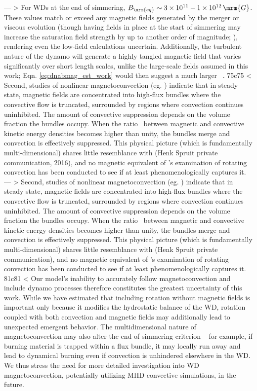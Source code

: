 ---
> \noindent For WDs at the end of simmering, $B_\mrm{eq} \sim 3\times10^{11}-1\times10^{12}\,\mrm{G}$.  These values match or exceed any magnetic fields generated by the merger or viscous evolution (though having fields in place at the start of simmering may increase the saturation field strength by up to another order of magnitude; \citealt{feat+09}), rendering even the low-field calculations uncertain.  Additionally, the turbulent nature of the dynamo will generate a highly tangled magnetic field that varies significantly over short length scales, unlike the large-scale fields assumed in this work; Eqn. \ref{eq:dnabmag_est_work} would then suggest a much larger \dnabmag\ \citep{chabgb07}.
75c75
< Second, studies of nonlinear magnetoconvection (eg. \citealt{procw82}) indicate that in steady state, magnetic fields are concentrated into high-flux bundles where the convective flow is truncated, surrounded by regions where convection continues uninhibited.  The amount of convective suppression depends on the volume fraction the bundles occupy.  When the ratio \EBEconv\ between magnetic and convective kinetic energy densities becomes higher than unity, the bundles merge and convection is effectively suppressed.  This physical picture (which is fundamentally multi-dimensional) shares little resemblance with \citeal{stev79} (Henk Spruit private communication, 2016), and no magnetic equivalent of \cite{barkdl14}'s examination of rotating convection has been conducted to see if \citeal{stev79} at least phenomenologically captures it.
---
> Second, studies of nonlinear magnetoconvection (eg. \citealt{procw82}) indicate that in steady state, magnetic fields are concentrated into high-flux bundles where the convective flow is truncated, surrounded by regions where convection continues uninhibited.  The amount of convective suppression depends on the volume fraction the bundles occupy.  When the ratio \EBEconv\ between magnetic and convective kinetic energy densities becomes higher than unity, the bundles merge and convection is effectively suppressed.  This physical picture (which is fundamentally multi-dimensional) shares little resemblance with \citeal{stev79} (Henk Spruit private communication), and no magnetic equivalent of \cite{barkdl14}'s examination of rotating convection has been conducted to see if \citeal{stev79} at least phenomenologically captures it.
81c81
< Our model's inability to accurately follow magnetoconvection and include dynamo processes therefore constitutes the greatest uncertainty of this work.  While we have estimated that including rotation without magnetic fields is important only because it modifies the hydrostatic balance of the WD, rotation coupled with both convection and magnetic fields may additionally lead to unexpected emergent behavior.  The multidimensional nature of magnetoconvection may also alter the end of simmering criterion -- for example, if burning material is trapped within a flux bundle, it may locally run away and lead to dynamical burning even if convection is unhindered elsewhere in the WD.  We thus stress the need for more detailed investigation into WD magnetoconvection, potentially utilizing MHD convective simulations, in the future.
